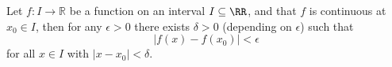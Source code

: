 

\begin{theorem}

Let $f:I\to\mathbb R$ be a function on an interval $I\subseteq \RR$, 
and that $f$ is continuous at $x_0\in I$, then for any $\epsilon>0$ 
there exists $\delta>0$ (depending on $\epsilon$) such that 
$$
|f(x)-f(x_0)| < \epsilon
$$
for all $x\in I$ with $|x-x_0|<\delta$.

\end{theorem}

